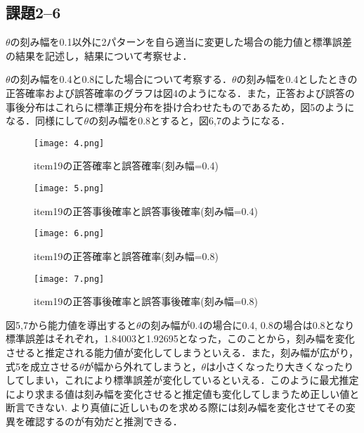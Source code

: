 \documentclass[12pt]{jarticle}
\begin{document}
\subsection{課題2–6}
\begin{shadebox}
    \quad $\theta$の刻み幅を0.1以外に2パターンを自ら適当に変更した場合の能力値と標準誤差の結果を記述し，結果について考察せよ．
\end{shadebox}
\vspace{\baselineskip}
$\theta$の刻み幅を0.4と0.8にした場合について考察する．$\theta$の刻み幅を0.4としたときの正答確率および誤答確率のグラフは図4のようになる．また，正答および誤答の事後分布はこれらに標準正規分布を掛け合わせたものであるため，図5のようになる．同様にして$\theta$の刻み幅を0.8とすると，図6,7のようになる．
\begin{figure}[h]
    \begin{center}
        \texttt{[image: 4.png]}
    \end{center}
    \caption{item19の正答確率と誤答確率(刻み幅=0.4)}
    \label{fig4}
\end{figure}
\clearpage
\begin{figure}[h]
    \begin{center}
        \texttt{[image: 5.png]}
    \end{center}
    \caption{item19の正答事後確率と誤答事後確率(刻み幅=0.4)}
    \label{fig5}
\end{figure}
\begin{figure}[h]
    \begin{center}
        \texttt{[image: 6.png]}
    \end{center}
    \caption{item19の正答確率と誤答確率(刻み幅=0.8)}
    \label{fig6}
\end{figure}
\clearpage
\begin{figure}[h]
    \begin{center}
        \texttt{[image: 7.png]}
    \end{center}
    \caption{item19の正答事後確率と誤答事後確率(刻み幅=0.8)}
    \label{fig7}
\end{figure}

図5,7から能力値を導出すると$\theta$の刻み幅が0.4の場合に0.4, 0.8の場合は0.8となり標準誤差はそれぞれ，1.84003と1.92695となった，このことから，刻み幅を変化させると推定される能力値が変化してしまうといえる．また，刻み幅が広がり，式5を成立させる$\theta$が幅から外れてしまうと，$\theta$は小さくなったり大きくなったりしてしまい，これにより標準誤差が変化しているといえる．このように最尤推定により求まる値は刻み幅を変化させると推定値も変化してしまうため正しい値と断言できない. より真値に近しいものを求める際には刻み幅を変化させてその変異を確認するのが有効だと推測できる．
\end{document}
